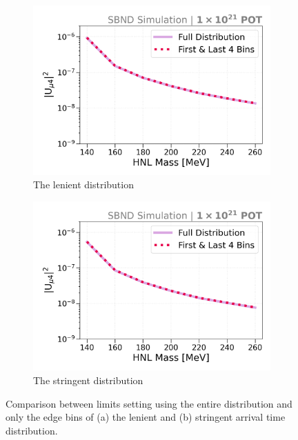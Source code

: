 \begin{figure}[htb!]
        \begin{subfigure}[b]{0.495\textwidth}
            \includegraphics[width=\textwidth]{sensitivity_loose_full_edge}
            \caption{The lenient distribution}%
        \end{subfigure}
        \begin{subfigure}[b]{0.495\textwidth}
            \includegraphics[width=\textwidth]{sensitivity_strict_full_edge}
            \caption{The stringent distribution}%
        \end{subfigure}
    \caption[Comparison Between Limits Setting using the Entire Distibution and Only Edge Bins]{Comparison between limits setting using the entire distribution and only the edge bins of (a) the lenient and (b) stringent arrival time distribution.}
    \label{fig:nupi0_reco_full_edge}
\end{figure}

